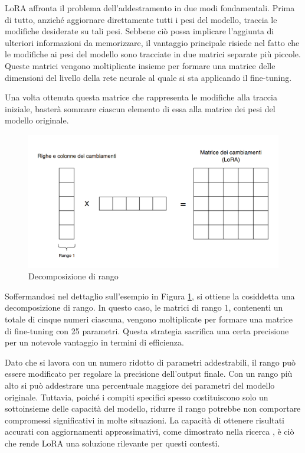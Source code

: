 LoRA affronta il problema dell'addestramento in due modi fondamentali. Prima di tutto, anziché aggiornare direttamente tutti i  pesi del modello, traccia le modifiche desiderate su tali pesi. Sebbene ciò possa implicare l'aggiunta di ulteriori informazioni da memorizzare, il vantaggio principale risiede nel fatto che le modifiche ai pesi del modello sono tracciate in due matrici separate più piccole. Queste matrici vengono moltiplicate insieme per formare una matrice delle dimensioni del livello della rete neurale al quale si sta applicando il fine-tuning.

Una volta ottenuta questa matrice che rappresenta le modifiche alla traccia iniziale, basterà sommare ciascun elemento di essa alla matrice dei pesi del modello originale.
\begin{figure}[H]
	\centering
	\includegraphics[width=\textwidth]{Immagini/lora_mul.png}
	\caption{Decomposizione di rango}
	\label{fig:lora_mul}
\end{figure}

Soffermandosi nel dettaglio sull'esempio in Figura \ref{fig:lora_mul}, si ottiene la cosiddetta una decomposizione di rango. In questo caso, le matrici di rango 1, contenenti un totale di cinque numeri ciascuna, vengono moltiplicate per formare una matrice di fine-tuning con 25 parametri. Questa strategia sacrifica una certa precisione per un notevole vantaggio in termini di efficienza. 

Dato che si lavora con un numero ridotto di parametri addestrabili, il rango può essere modificato per regolare la precisione dell'output finale. Con un rango più alto si può addestrare una percentuale maggiore dei parametri del modello originale. Tuttavia, poiché i compiti specifici spesso costituiscono solo un sottoinsieme delle capacità del modello, ridurre il rango potrebbe non comportare compromessi significativi in molte situazioni. La capacità di ottenere risultati accurati con aggiornamenti approssimativi, come dimostrato nella ricerca \cite{lora}, è ciò che rende LoRA una soluzione rilevante per questi contesti.

